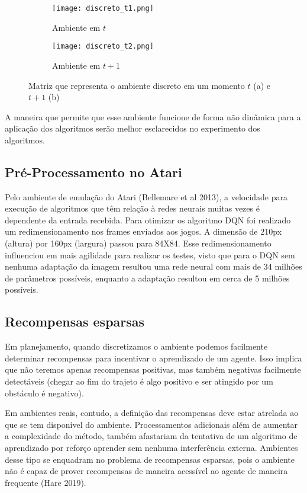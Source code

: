 \documentclass[letterpaper]{article} %
\begin{document}
\begin{figure}[h]
     \begin{subfigure}[h]{0.2\textwidth}
         \centering
         \texttt{[image: discreto\_t1.png]}
         \caption{Ambiente em $t$}
     \end{subfigure}
     \hfill
     \begin{subfigure}[h]{0.2\textwidth}
         \texttt{[image: discreto\_t2.png]}
         \caption{Ambiente em $t+1$}
     \end{subfigure}
        \caption{Matriz que representa o ambiente discreto em um momento $t$ (a) e $t+1$ (b)}
\end{figure}

A maneira que permite que esse ambiente funcione de forma não dinâmica para a aplicação dos algoritmos serão melhor esclarecidos no experimento dos algoritmos.

\subsection{Pré-Processamento no Atari}
Pelo ambiente de emulação do Atari (Bellemare et al 2013), a velocidade para execução de algoritmos que têm relação à redes neurais muitas vezes é dependente da entrada recebida. Para otimizar os algoritmo DQN foi realizado um redimensionamento nos frames enviados aos jogos. A dimensão de 210px (altura) por 160px (largura) passou para 84X84. Esse redimensionamento influenciou em mais agilidade para realizar os testes, visto que para o DQN sem nenhuma adaptação da imagem resultou uma rede neural com mais de 34 milhões de parâmetros possíveis, enquanto a adaptação resultou em cerca de 5 milhões possíveis.

\subsection{Recompensas esparsas}
Em planejamento, quando discretizamos o ambiente podemos facilmente determinar recompensas para incentivar o aprendizado de um agente. Isso implica que não teremos apenas recompensas positivas, mas também negativas facilmente detectáveis (chegar ao fim do trajeto é algo positivo e ser atingido por um obstáculo é negativo).

Em ambientes reais, contudo, a definição das recompensas deve estar atrelada ao que se tem disponível do ambiente. Processamentos adicionais além de aumentar a complexidade do método, também afastariam da tentativa de um algoritmo de aprendizado por reforço aprender sem nenhuma interferência externa. Ambientes desse tipo se enquadram no problema de recompensas esparsas, pois o ambiente não é capaz de prover recompensas de maneira acessível ao agente de maneira frequente (Hare 2019).
\end{document}
